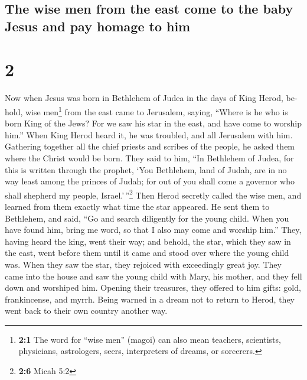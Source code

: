 \begin{paracol}{2}
\begin{otherlanguage}{english}
\hypertarget{the-wise-men-from-the-east-come-to-the-baby-jesus-and-pay-homage-to-him}{%
\subsection{The wise men from the east come to the baby Jesus and pay
homage to
him}\label{the-wise-men-from-the-east-come-to-the-baby-jesus-and-pay-homage-to-him}}

\hypertarget{section-3}{%
\section{2}\label{section-3}}

 Now when Jesus was born in Bethlehem of Judea in the days
of King Herod, behold, wise men\footnote{\textbf{2:1} The word for
  ``wise men'' (magoi) can also mean teachers, scientists, physicians,
  astrologers, seers, interpreters of dreams, or sorcerers.} from the
east came to Jerusalem, saying,  ``Where is he who is born
King of the Jews? For we saw his star in the east, and have come to
worship him.''  When King Herod heard it, he was troubled,
and all Jerusalem with him.  Gathering together all the
chief priests and scribes of the people, he asked them where the Christ
would be born.  They said to him, ``In Bethlehem of Judea,
for this is written through the prophet,  `You Bethlehem,
land of Judah, are in no way least among the princes of Judah; for out
of you shall come a governor who shall shepherd my people,
Israel.'\,''\footnote{\textbf{2:6} Micah 5:2}  Then Herod
secretly called the wise men, and learned from them exactly what time
the star appeared.  He sent them to Bethlehem, and said,
``Go and search diligently for the young child. When you have found him,
bring me word, so that I also may come and worship him.'' 
They, having heard the king, went their way; and behold, the star, which
they saw in the east, went before them until it came and stood over
where the young child was.  When they saw the star, they
rejoiced with exceedingly great joy.  They came into the
house and saw the young child with Mary, his mother, and they fell down
and worshiped him. Opening their treasures, they offered to him gifts:
gold, frankincense, and myrrh.  Being warned in a dream
not to return to Herod, they went back to their own country another way.

\hypertarget{josephs-flight-into-egypt}{%
}
\end{otherlanguage}
\end{paracol}
